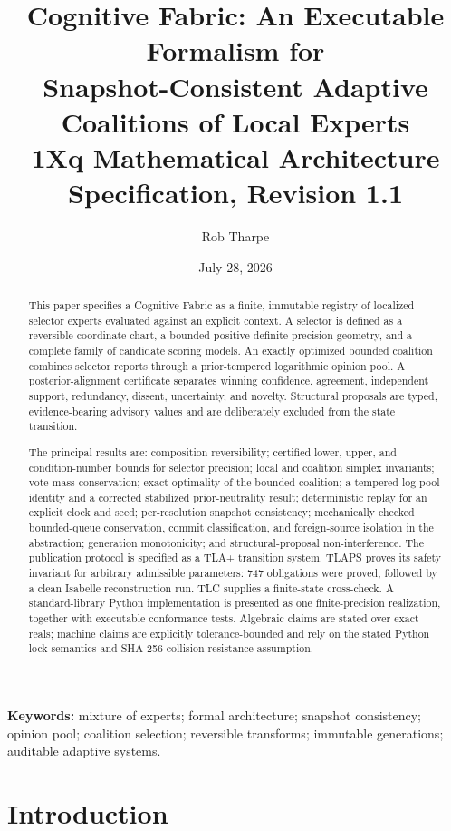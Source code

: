 \documentclass[11pt]{article}
\title{\vspace{-8mm}
  \textbf{Cognitive Fabric: An Executable Formalism for\\
  Snapshot-Consistent Adaptive Coalitions of Local Experts}\\[2mm]
  \large 1Xq Mathematical Architecture Specification, Revision 1.1
}
\author{Rob Tharpe}
\date{July 28, 2026}
\theoremstyle{definition}
\theoremstyle{plain}
\begin{document}
\maketitle

\begin{abstract}
This paper specifies a Cognitive Fabric as a finite, immutable registry of
localized selector experts evaluated against an explicit context.  A selector
is defined as a reversible coordinate chart, a bounded positive-definite
precision geometry, and a complete family of candidate scoring models.  An
exactly optimized bounded coalition combines selector reports through a
prior-tempered logarithmic opinion pool.  A posterior-alignment certificate
separates winning confidence, agreement, independent support, redundancy,
dissent, uncertainty, and novelty.  Structural proposals are typed,
evidence-bearing advisory values and are deliberately excluded from the state
transition.

The principal results are: composition reversibility; certified lower, upper,
and condition-number bounds for selector precision; local and coalition
simplex invariants; vote-mass conservation; exact optimality of the bounded
coalition; a tempered log-pool identity and a corrected stabilized
prior-neutrality result;
deterministic replay for an explicit clock and seed; per-resolution snapshot
consistency; mechanically checked bounded-queue conservation, commit
classification, and foreign-source isolation in the abstraction; generation
monotonicity; and
structural-proposal non-interference.  The publication protocol is specified
as a TLA+ transition system.  TLAPS proves its safety invariant for arbitrary
admissible parameters: 747 obligations were proved, followed by a clean
Isabelle reconstruction run.  TLC supplies a finite-state cross-check.  A
standard-library Python implementation is presented as one finite-precision
realization, together with executable conformance tests.  Algebraic claims are
stated over exact reals; machine claims are explicitly tolerance-bounded and
rely on the stated Python lock semantics and SHA-256 collision-resistance
assumption.
\end{abstract}

\noindent\textbf{Keywords:}
mixture of experts; formal architecture; snapshot consistency; opinion pool;
coalition selection; reversible transforms; immutable generations; auditable
adaptive systems.

\section{Introduction}
\end{document}
